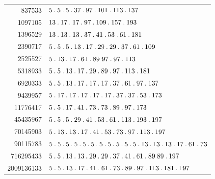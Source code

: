\begin{longtable}{@{}r|l@{}}
837533 & $5\pdot 5\pdot 5\pdot 37\pdot 97\pdot 101\pdot 113\pdot 137$\\
1097105 & $13\pdot 17\pdot 17\pdot 97\pdot 109\pdot 157\pdot 193$\\
1396529 & $13\pdot 13\pdot 13\pdot 37\pdot 41\pdot 53\pdot 61\pdot 181$\\
2390717 & $5\pdot 5\pdot 5\pdot 13\pdot 17\pdot 29\pdot 29\pdot 37\pdot 61\pdot 109$\\
2525527 & $5\pdot 13\pdot 17\pdot 61\pdot 89\;97\pdot 97\pdot 113$\\
5318933 & $5\pdot 5\pdot 13\pdot 17\pdot 29\pdot 89\pdot 97\pdot 113\pdot 181$\\
6920333 & $5\pdot 5\pdot 13\pdot 17\pdot 17\pdot 17\pdot 37\pdot 61\pdot 97\pdot 137$\\
9439957 & $5\pdot 17\pdot 17\pdot 17\pdot 17\pdot 17\pdot 37\pdot 37\pdot 53\pdot 173$\\
11776417 & $5\pdot 5\pdot 17\pdot 41\pdot 73\pdot 73\pdot 89\pdot 97\pdot 173$\\
45435967 & $5\pdot 5\pdot 5\pdot 29\pdot 41\pdot 53\pdot 61\pdot 113\pdot 193\pdot 197$\\
70145903 & $5\pdot 13\pdot 13\pdot 17\pdot 41\pdot 53\pdot 73\pdot 97\pdot 113\pdot 197$\\
90115783 & $5\pdot 5\pdot 5\pdot 5\pdot 5\pdot 5\pdot 5\pdot 5\pdot 5\pdot 5\pdot 5\pdot 13\pdot 13\pdot 13\pdot 17\pdot 61\pdot 73$\\
716295433 & $5\pdot 5\pdot 13\pdot 13\pdot 29\pdot 29\pdot 37\pdot 41\pdot 61\pdot 89\;89\pdot 197$\\
2009136133 & $5\pdot 5\pdot 13\pdot 17\pdot 41\pdot 61\pdot 73\pdot 89\pdot 97\pdot 113\pdot 181\pdot 197$\\
\end{longtable}\endgroup
\par\medskip\begingroup\small\setlength{\tabcolsep}{5pt}
